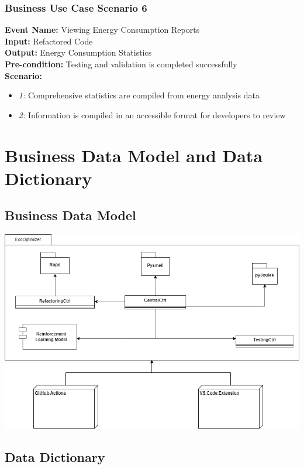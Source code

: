 \documentclass[12pt]{article}
\begin{document}
\subsubsection{Business Use Case Scenario 6} 
\textbf{Event Name:} Viewing Energy Consumption Reports \\
\textbf{Input:} Refactored Code \\
\textbf{Output:} Energy Consumption Statistics \\
\textbf{Pre-condition:} Testing and validation is completed successfully \\
\textbf{Scenario: } \\
\begin{itemize}
    \item \textit{1:} Comprehensive statistics are compiled from energy analysis data
    \item \textit{2:} Information is compiled in an accessible format for developers to review
\end{itemize}


\section{Business Data Model and Data Dictionary}
\subsection{Business Data Model}
\includegraphics[width=\textwidth]{../Images/business-data-model.png}
\subsection{Data Dictionary}
\end{document}
